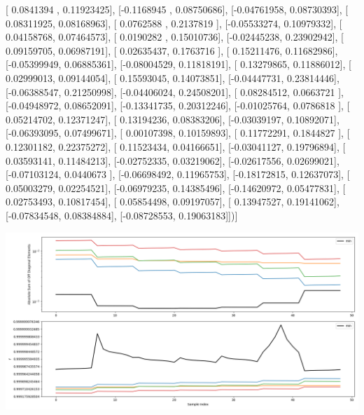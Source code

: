 \documentclass{article}
\begin{document}
       [ 0.0841394 ,  0.11923425],
       [-0.1168945 ,  0.08750686],
       [-0.04761958,  0.08730393],
       [ 0.08311925,  0.08168963],
       [ 0.0762588 ,  0.2137819 ],
       [-0.05533274,  0.10979332],
       [ 0.04158768,  0.07464573],
       [ 0.0190282 ,  0.15010736],
       [-0.02445238,  0.23902942],
       [ 0.09159705,  0.06987191],
       [ 0.02635437,  0.1763716 ],
       [ 0.15211476,  0.11682986],
       [-0.05399949,  0.06885361],
       [-0.08004529,  0.11818191],
       [ 0.13279865,  0.11886012],
       [ 0.02999013,  0.09144054],
       [ 0.15593045,  0.14073851],
       [-0.04447731,  0.23814446],
       [-0.06388547,  0.21250998],
       [-0.04406024,  0.24508201],
       [ 0.08284512,  0.0663721 ],
       [-0.04948972,  0.08652091],
       [-0.13341735,  0.20312246],
       [-0.01025764,  0.0786818 ],
       [ 0.05214702,  0.12371247],
       [ 0.13194236,  0.08383206],
       [-0.03039197,  0.10892071],
       [-0.06393095,  0.07499671],
       [ 0.00107398,  0.10159893],
       [ 0.11772291,  0.1844827 ],
       [ 0.12301182,  0.22375272],
       [ 0.11523434,  0.04166651],
       [-0.03041127,  0.19796894],
       [ 0.03593141,  0.11484213],
       [-0.02752335,  0.03219062],
       [-0.02617556,  0.02699021],
       [-0.07103124,  0.0440673 ],
       [-0.06698492,  0.11965753],
       [-0.18172815,  0.12637073],
       [ 0.05003279,  0.02254521],
       [-0.06979235,  0.14385496],
       [-0.14620972,  0.05477831],
       [ 0.02753493,  0.10817454],
       [ 0.05854498,  0.09197057],
       [ 0.13947527,  0.19141062],
       [-0.07834548,  0.08384884],
       [-0.08728553,  0.19063183]])]
\begin{center}
\includegraphics[scale=.9]{report_pickled_controls138/control_dpn_all.png}

\end{center}
\end{document}
